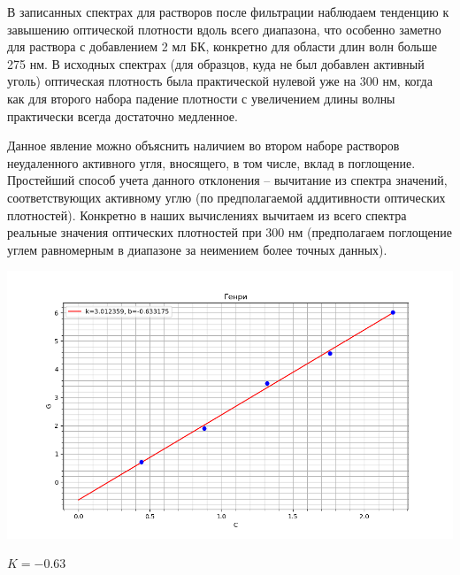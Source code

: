 \documentclass[a4paper]{article}
\begin{document}
\newpage

В записанных спектрах для растворов после фильтрации наблюдаем тенденцию к завышению оптической плотности вдоль всего диапазона, что особенно заметно для раствора с добавлением 2 мл БК, конкретно для области длин волн больше 275 нм. В исходных спектрах (для образцов, куда не был добавлен активный уголь) оптическая плотность была практической нулевой уже на 300 нм, когда как для второго набора падение плотности с увеличением длины волны практически всегда достаточно медленное. \par \vspace{0.3 cm}
Данное явление можно объяснить наличием во втором наборе растворов неудаленного активного угля, вносящего, в том числе, вклад в поглощение. Простейший способ учета данного отклонения -- вычитание из спектра значений, соответствующих активному углю (по предполагаемой аддитивности оптических плотностей). Конкретно в наших вычислениях вычитаем из всего спектра реальные значения оптических плотностей при 300 нм (предполагаем поглощение углем равномерным в диапазоне за неимением более точных данных).

\graphicspath{{./}}
		\begin{center}
		
			\includegraphics[scale=0.8]{Генри.png}
	

	\par
 \vspace{0.3cm}
 \end{center}
\vspace{0.3cm}
\par
\begin{center}
	$K = -0.63$\\
\end{center}
\end{document}
